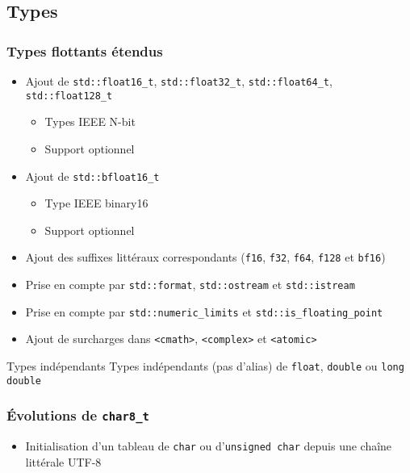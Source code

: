 \documentclass[C++.tex]{subfiles}
\begin{document}
\subsection*{Types}
\begin{frame}[fragile]
	\frametitle{Types flottants étendus}
	\begin{itemize}
		\item Ajout de \lstinline|std::float16_t|, \lstinline|std::float32_t|, \lstinline|std::float64_t|, \lstinline|std::float128_t|
		\begin{itemize}
			\item Types IEEE N-bit
			\item Support optionnel
		\end{itemize}
		\item Ajout de \lstinline|std::bfloat16_t|
		\begin{itemize}
			\item Type IEEE binary16
			\item Support optionnel
		\end{itemize}
		\item Ajout des suffixes littéraux correspondants (\lstinline|f16|, \lstinline|f32|, \lstinline|f64|, \lstinline|f128| et \lstinline|bf16|)
		\item Prise en compte par \lstinline|std::format|, \lstinline|std::ostream| et \lstinline|std::istream|
		\item Prise en compte par \lstinline|std::numeric_limits| et \lstinline|std::is_floating_point|
		\item Ajout de surcharges dans \lstinline|<cmath>|, \lstinline|<complex>| et \lstinline|<atomic>|
	\end{itemize}

	\begin{alertblock}{Types indépendants}
		Types indépendants (pas d'alias) de \lstinline|float|, \lstinline|double| ou \lstinline|long double|
	\end{alertblock}
\end{frame}

\begin{frame}[fragile]
	\frametitle{Évolutions de \lstinline|char8_t|}
	\begin{itemize}
		\item Initialisation d'un tableau de \lstinline|char| ou d'\lstinline|unsigned char| depuis une chaîne littérale UTF-8
	\end{itemize}
\end{frame}
\end{document}
